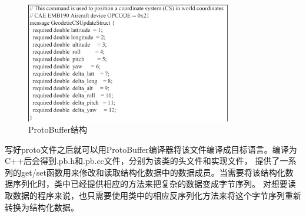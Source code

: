 \begin{figure}[h!]
    \begin{center}
        \includegraphics[width=0.8\textwidth]{pictures/code15.pdf}
        \caption{ProtoBuffer结构}
        \label{pb21}
    \end{center}
\end{figure}
\par
写好proto文件之后就可以用ProtoBuffer编译器将该文件编译成目标语言。编译为C++后会得到.pb.h和.pb.cc文件，分别为该类的头文件和实现文件，
提供了一系列的get/set函数用来修改和读取结构化数据中的数据成员。当需要将该结构化数据序列化时，类中已经提供相应的方法来把复杂的数据变成字节序列。
对想要读取数据的程序来说，也只需要使用类中的相应反序列化方法来将这个字节序列重新转换为结构化数据。

